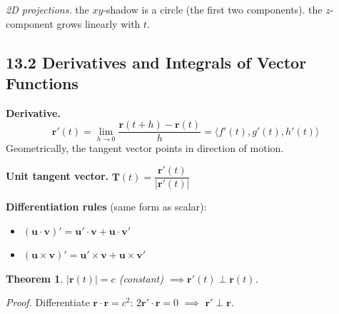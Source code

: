 \documentclass[12pt]{article}
\theoremstyle{compact}
\newtheorem{thm}{Theorem}[section]
\renewcommand{\vec}[1]{\mathbf{#1}}
\newcommand{\vv}[1]{\langle #1 \rangle}
\begin{document}
\textit{2D projections.} the $xy$-shadow is a circle (the first two components). the $z$-component grows linearly with $t$.

\begin{center}
\end{center}

\subsection{13.2 Derivatives and Integrals of Vector Functions}

\textbf{Derivative.}
\[
\vec{r}'(t) = \lim_{h\to 0}\frac{\vec{r}(t+h)-\vec{r}(t)}{h} = \vv{f'(t),g'(t),h'(t)}
\]
Geometrically, the tangent vector points in direction of motion.

\textbf{Unit tangent vector.} $\vec{T}(t) = \dfrac{\vec{r}'(t)}{|\vec{r}'(t)|}$

\textbf{Differentiation rules} (same form as scalar):
\begin{itemize}[noitemsep]
\item $(\vec{u}\cdot\vec{v})' = \vec{u}'\cdot\vec{v}+\vec{u}\cdot\vec{v}'$
\item $(\vec{u}\times\vec{v})' = \vec{u}'\times\vec{v}+\vec{u}\times\vec{v}'$
\end{itemize}

\begin{thm}
$|\vec{r}(t)|=c$ (constant) $\implies \vec{r}'(t)\perp\vec{r}(t)$.
\end{thm}
\textit{Proof.} Differentiate $\vec{r}\cdot\vec{r}=c^2$: $2\vec{r}'\cdot\vec{r}=0$ $\implies$ $\vec{r}'\perp\vec{r}$.
\end{document}
